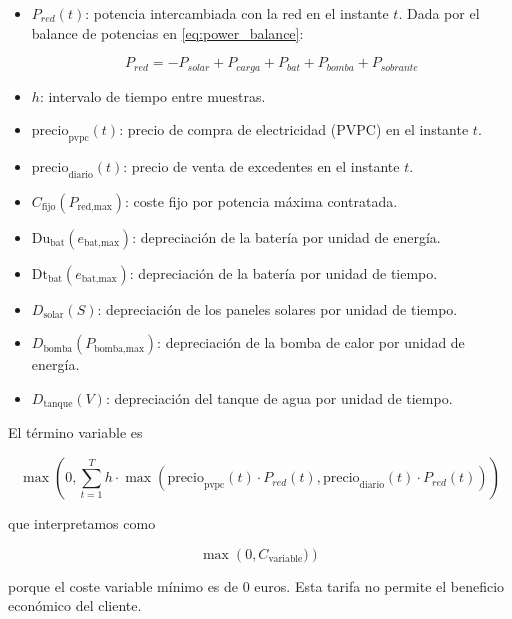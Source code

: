 \begin{itemize}
	\item $P_{red}(t)$: potencia intercambiada con la red en el instante $t$.
	      Dada por el balance de potencias en \eqref{eq:power_balance}:

	      \begin{equation} \label{eq:p_grid}
		      P_{red} =  - P_{solar} + P_{carga} + P_{bat} + P_{bomba} + P_{sobrante}
	      \end{equation}

	\item $h$: intervalo de tiempo entre muestras.
	\item $\text{precio}_\text{pvpc}(t)$: precio de compra de electricidad (PVPC)
	      en el instante $t$.
	\item $\text{precio}_\text{diario}(t)$: precio de venta de excedentes en
	      el instante $t$.
	\item $C_\text{fijo}(P_\text{red,max})$: coste fijo por potencia máxima
	      contratada.
	\item $\text{Du}_\text{bat}(e_\text{bat,max})$: depreciación de la batería por unidad
	      de energía.
	\item $\text{Dt}_\text{bat}(e_\text{bat,max})$: depreciación de la batería por unidad
	      de tiempo.
	\item $D_\text{solar}(S)$: depreciación de los paneles solares por unidad de
	      tiempo.
	\item $D_\text{bomba}(P_\text{bomba,max})$: depreciación de la bomba de calor
	      por unidad de energía.
	\item $D_\text{tanque}(V)$: depreciación del tanque de agua por unidad de
	      tiempo.
\end{itemize}


El término variable es

\begin{equation}
	\max \left(0, \sum_{t=1}^{T} h \cdot \max(\text{precio}_\text{pvpc}(t) \cdot P_{red}(t), \text{precio}_\text{diario}(t) \cdot P_{red}(t)) \right)
\end{equation}


que interpretamos como

\begin{equation}
	\max \left(0, C_{\text{variable}}) \right)
\end{equation}

porque el coste variable mínimo es de 0 euros. Esta tarifa no permite el
beneficio económico del cliente.

